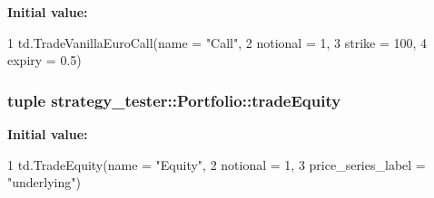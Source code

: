 {\bfseries \-Initial value\-:}
\begin{DoxyCode}
1 td.TradeVanillaEuroCall(name = "Call",
2                                         notional = 1,
3                                         strike = 100,
4                                         expiry = 0.5)
\end{DoxyCode}
\hypertarget{namespacestrategy__tester_1_1Portfolio_a08d7e6652b7acb7c5460b4aaa121dd46}{
\subsubsection[{trade\-Equity}]{\setlength{\rightskip}{0pt plus 5cm}tuple strategy\-\_\-tester\-::\-Portfolio\-::trade\-Equity}}\label{namespacestrategy__tester_1_1Portfolio_a08d7e6652b7acb7c5460b4aaa121dd46}
{\bfseries \-Initial value\-:}
\begin{DoxyCode}
1 td.TradeEquity(name = "Equity", 
2                                  notional = 1, 
3                                  price_series_label = "underlying")
\end{DoxyCode}
